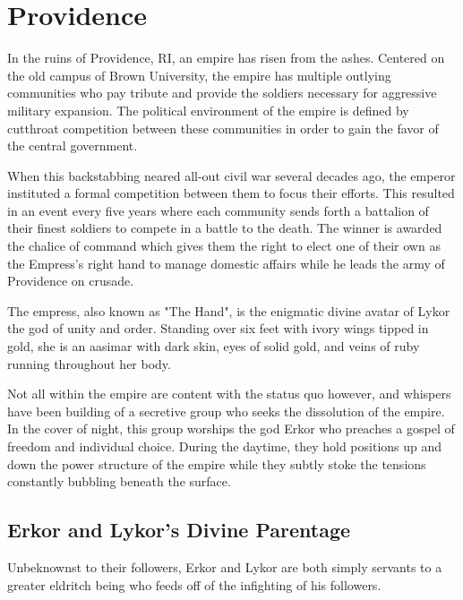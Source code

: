 \documentclass[././main.tex]{subfiles}
\begin{document}
\section{Providence}

In the ruins of Providence, RI, an empire has risen from the ashes. Centered on the old campus of Brown University, the empire has multiple outlying communities who pay tribute and provide the soldiers necessary for aggressive military expansion. The political environment of the empire is defined by cutthroat competition between these communities in order to gain the favor of the central government. 

When this backstabbing neared all-out civil war several decades ago, the emperor instituted a formal competition between them to focus their efforts. This resulted in an event every five years where each community sends forth a battalion of their finest soldiers to compete in a battle to the death. The winner is awarded the chalice of command which gives them the right to elect one of their own as the Empress's right hand to manage domestic affairs while he leads the army of Providence on crusade.

The empress, also known as "The Hand", is the enigmatic divine avatar of Lykor the god of unity and order. Standing over six feet with ivory wings tipped in gold, she is an aasimar with dark skin, eyes of solid gold, and veins of ruby running throughout her body. 

Not all within the empire are content with the status quo however, and whispers have been building of a secretive group who seeks the dissolution of the empire. In the cover of night, this group worships the god Erkor who preaches a gospel of freedom and individual choice. During the daytime, they hold positions up and down the power structure of the empire while they subtly stoke the tensions constantly bubbling beneath the surface.

\subsection{Erkor and Lykor's Divine Parentage}
Unbeknownst to their followers, Erkor and Lykor are both simply servants to a greater eldritch being who feeds off of the infighting of his followers. 
\end{document}
